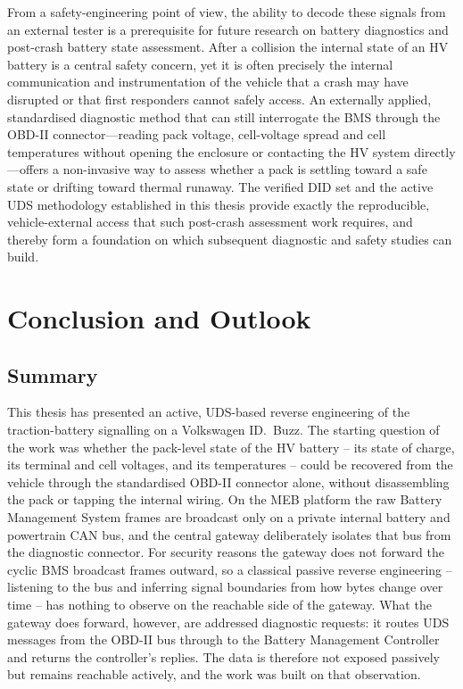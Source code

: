 \documentclass[11pt,a4paper,oneside,parskip=half]{scrreprt}
\begin{document}
From a safety-engineering point of view, the ability to decode these signals from an external tester is a prerequisite for future research on battery diagnostics and post-crash battery state assessment. After a collision the internal state of an HV battery is a central safety concern, yet it is often precisely the internal communication and instrumentation of the vehicle that a crash may have disrupted or that first responders cannot safely access. An externally applied, standardised diagnostic method that can still interrogate the BMS through the OBD-II connector---reading pack voltage, cell-voltage spread and cell temperatures without opening the enclosure or contacting the HV system directly---offers a non-invasive way to assess whether a pack is settling toward a safe state or drifting toward thermal runaway. The verified DID set and the active UDS methodology established in this thesis provide exactly the reproducible, vehicle-external access that such post-crash assessment work requires, and thereby form a foundation on which subsequent diagnostic and safety studies can build.


\chapter{Conclusion and Outlook}
\section{Summary}
This thesis has presented an active, UDS-based reverse engineering of the traction-battery signalling on a Volkswagen ID.~Buzz. The starting question of the work was whether the pack-level state of the HV battery -- its state of charge, its terminal and cell voltages, and its temperatures -- could be recovered from the vehicle through the standardised OBD-II connector alone, without disassembling the pack or tapping the internal wiring. On the MEB platform the raw Battery Management System frames are broadcast only on a private internal battery and powertrain CAN bus, and the central gateway deliberately isolates that bus from the diagnostic connector. For security reasons the gateway does not forward the cyclic BMS broadcast frames outward, so a classical passive reverse engineering -- listening to the bus and inferring signal boundaries from how bytes change over time -- has nothing to observe on the reachable side of the gateway. What the gateway does forward, however, are addressed diagnostic requests: it routes UDS messages from the OBD-II bus through to the Battery Management Controller and returns the controller's replies. The data is therefore not exposed passively but remains reachable actively, and the work was built on that observation.
\end{document}
